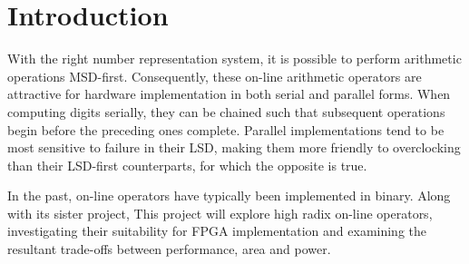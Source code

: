 \section{Introduction}
With the right number representation system, it is possible to perform
arithmetic operations MSD-first.
Consequently, these on-line arithmetic operators are attractive
for hardware implementation in both serial and parallel forms.
When computing digits serially, they can be chained such that subsequent
operations begin before the preceding ones complete.
Parallel implementations tend to be most sensitive to failure in their LSD,
making them more friendly to overclocking than their LSD-first counterparts,
for which the opposite is true.

In the past, on-line operators have typically been implemented in binary.
Along with its sister project,
This project will explore high radix on-line operators,
investigating their suitability for FPGA implementation and examining the
resultant trade-offs between performance, area and power.
